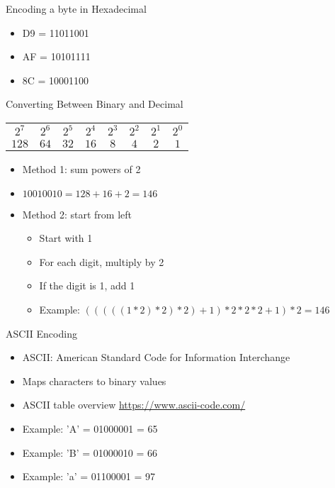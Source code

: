 \begin{withoutheadline}
\begin{frame}{Encoding a byte in Hexadecimal}
\begin{itemize}
    \item D9 = 11011001
    \item AF = 10101111
    \item 8C = 10001100
\end{itemize}
\end{frame}

\begin{frame}{Converting Between Binary and Decimal}
\ttfamily
\begin{tabular}{c|c|c|c|c|c|c|c}
    $2^7$ & $2^6$ & $2^5$ & $2^4$ & $2^3$ & $2^2$ & $2^1$ & $2^0$ \\
    $128$ & $64$  & $32$  & $16$  & $8$   & $4$   & $2$   & $1$   \\
\end{tabular}

\begin{itemize}
    \item Method 1: sum powers of 2
    \item $10010010 = 128 + 16 + 2 = 146$
    \item Method 2: start from left
    \begin{itemize}
        \item Start with 1
        \item For each digit, multiply by 2
        \item If the digit is 1, add 1
        \item Example: $(((((1 * 2) * 2) * 2) + 1) * 2 * 2 * 2 + 1) * 2 = 146$
    \end{itemize}
\end{itemize}
\end{frame}

\begin{frame}{ASCII Encoding}
\begin{itemize}
    \item ASCII: American Standard Code for Information Interchange
    \item Maps characters to binary values
    \item ASCII table overview \url{https://www.ascii-code.com/}
    \item Example: 'A' = 01000001 = 65
    \item Example: 'B' = 01000010 = 66
    \item Example: 'a' = 01100001 = 97
\end{itemize}
\end{frame}


\end{withoutheadline}
